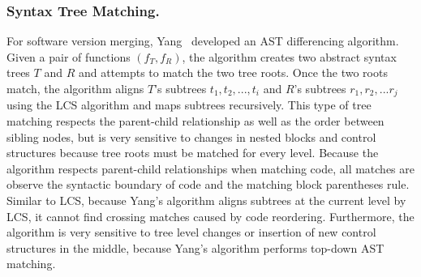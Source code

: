 
\subsubsection{Syntax Tree Matching.}
For software version merging, Yang~\cite{Yang1991} developed an AST differencing algorithm. Given a pair of functions $(f_T,f_R)$, the algorithm creates two abstract syntax trees $T$ and $R$ and attempts to match the two tree roots. Once the two roots match, the algorithm aligns $T$'s subtrees ${t_1, t_2, ..., t_i}$ and $R$'s subtrees ${r_1, r_2, ... r_j}$ using the LCS algorithm and maps subtrees recursively. This type of tree matching respects the parent-child relationship as well as the order between sibling nodes, but is very sensitive to changes in nested blocks and control structures because tree roots must be matched for every level. 
Because the algorithm respects parent-child relationships when matching code, all matches are observe the syntactic boundary of code and  the matching block parentheses rule. Similar to LCS, because Yang's algorithm aligns subtrees at the current level by LCS, it cannot find crossing matches caused by code reordering. Furthermore, the algorithm is very sensitive to tree level changes or insertion of new control structures in the middle, because Yang's algorithm performs top-down AST matching. 

